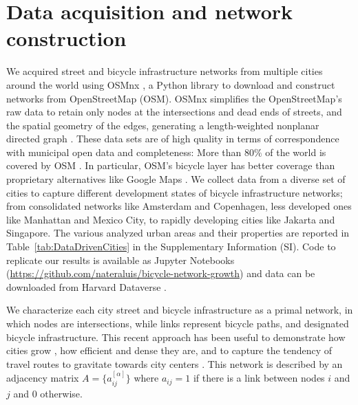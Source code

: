 \section{Data acquisition and network construction}
We acquired street and bicycle infrastructure networks from multiple cities around the world using OSMnx \cite{Boeing2017OSMNX}, a Python library to download and construct networks from OpenStreetMap (OSM). OSMnx simplifies the OpenStreetMap's raw data to retain only nodes at the intersections and dead ends of streets, and the spatial geometry of the edges, generating a length-weighted nonplanar directed graph \cite{Boeing2020Planarity}. These data sets are of high quality \cite{Haklay2010OpenStreetMap,Girres2010Quality} in terms of correspondence with municipal open data \cite{Ferster2019Bicycle} and completeness: More than $80\%$ of the world is covered by OSM \cite{Barbosa-Filho2017Models}. In particular, OSM's bicycle layer has better coverage than proprietary alternatives like Google Maps \cite{Hochmair2012}. We collect data from a diverse set of cities to capture different development states of bicycle infrastructure networks; from consolidated networks like Amsterdam and Copenhagen, less developed ones like Manhattan and Mexico City, to rapidly developing cities like Jakarta and Singapore. The various analyzed urban areas and their properties are reported in Table~\ref{tab:DataDrivenCities} in the Supplementary Information (SI). Code to replicate our results is available as Jupyter Notebooks (\url{https://github.com/nateraluis/bicycle-network-growth}) and data can be downloaded from Harvard Dataverse \cite{natera2019data}.

We characterize each city street and bicycle infrastructure as a primal network, \cite{Porta2006Primal} in which nodes are intersections, while links represent bicycle paths, and designated bicycle infrastructure. This recent approach has been useful to demonstrate how cities grow \cite{Strano2012Evolution,Barthelemy2013Evolution}, how efficient \cite{Gallotti2014Efficiency} and dense they are, and to capture the tendency of travel routes to gravitate towards city centers \cite{Lee2017Morphology}. This network is described by an adjacency matrix $A=\{a_{ij}^{[\alpha]}\}$ where $a_{ij}=1$ if there is a link between nodes $i$ and $j$ and 0 otherwise.

